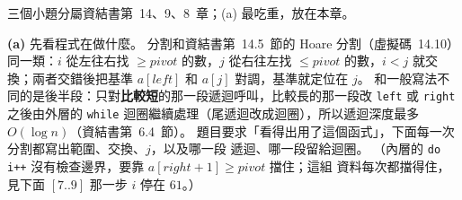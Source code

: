 \begin{pastsoln}
三個小題分屬資結書第~14、9、8~章；(a) 最吃重，放在本章。

\textbf{(a)} 先看程式在做什麼。 分割和資結書第~14.5~節的 Hoare 分割（虛擬碼~14.10）同一類：$i$ 從左往右找
$\ge \mathit{pivot}$ 的數，$j$ 從右往左找 $\le \mathit{pivot}$ 的數，$i < j$ 就交換；兩者交錯後把基準 $a[\mathit{left}]$ 和
$a[j]$ 對調，基準就定位在 $j$。 和一般寫法不同的是後半段：只對\textbf{比較短}的那一段遞迴呼叫，比較長的那一段改
\texttt{left} 或 \texttt{right} 之後由外層的 \texttt{while} 迴圈繼續處理（尾遞迴改成迴圈），所以遞迴深度最多
$O(\log n)$（資結書第~6.4~節）。 題目要求「看得出用了這個函式」，下面每一次分割都寫出範圍、交換、$j$，以及哪一段
遞迴、哪一段留給迴圈。 （內層的 \texttt{do i++} 沒有檢查邊界，要靠 $a[\mathit{right}+1] \ge \mathit{pivot}$ 擋住；這組
資料每次都擋得住，見下面 $[7..9]$ 那一步 $i$ 停在 $61$。）


\end{pastsoln}
